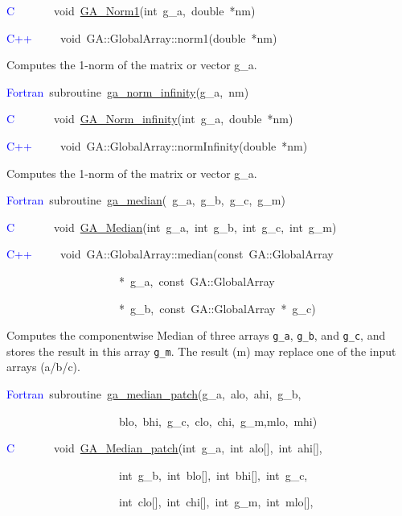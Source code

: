 \textcolor{blue}{C}~~~~~~~void~\href{https://hpc.pnl.gov/globalarrays/api/c_op_api.html\#ga_norm1}{GA\_{}Norm1}(int~g\_a,~double~{*}nm)

\textcolor{blue}{C++}~~~~~void~GA::GlobalArray::norm1(double~{*}nm)

Computes the 1-norm of the matrix or vector g\_a. 

\textcolor{blue}{Fortran}~subroutine~\href{https://hpc.pnl.gov/globalarrays/api/f_op_api.html\#ga_norm_infinity}{ga\_{}norm\_{}infinity}(g\_a,~nm)~

\textcolor{blue}{C}~~~~~~~void~\href{https://hpc.pnl.gov/globalarrays/api/c_op_api.html\#ga_norm_infinity}{GA\_{}Norm\_{}infinity}(int~g\_a,~double~{*}nm)~

\textcolor{blue}{C++}~~~~~void~GA::GlobalArray::normInfinity(double~{*}nm)

Computes the 1-norm of the matrix or vector g\_a. 

\textcolor{blue}{Fortran}~subroutine~\href{https://hpc.pnl.gov/globalarrays/api/f_op_api.html\#ga_median}{ga\_{}median}(~g\_a,~g\_b,~g\_c,~g\_m)

\textcolor{blue}{C}~~~~~~~void~\href{https://hpc.pnl.gov/globalarrays/api/c_op_api.html\#ga_median}{GA\_{}Median}(int~g\_a,~int~g\_b,~int~g\_c,~int~g\_m)

\textcolor{blue}{C++}~~~~~void~GA::GlobalArray::median(const~GA::GlobalArray~

~~~~~~~~~~~~~~~~~~~~{*}~g\_a,~const~GA::GlobalArray~

~~~~~~~~~~~~~~~~~~~~{*}~g\_b,~const~GA::GlobalArray~{*}~g\_c)

Computes the componentwise Median of three arrays \texttt{g\_a}, \texttt{g\_b},
and \texttt{g\_c}, and stores the result in this array \texttt{g\_m}.
The result (m) may replace one of the input arrays (a/b/c). 

\textcolor{blue}{Fortran}~subroutine~\href{https://hpc.pnl.gov/globalarrays/api/f_op_api.html\#ga_median_patch}{ga\_{}median\_{}patch}(g\_a,~alo,~ahi,~g\_b,~

~~~~~~~~~~~~~~~~~~~~blo,~bhi,~g\_c,~clo,~chi,~g\_m,mlo,~mhi)~

\textcolor{blue}{C}~~~~~~~void~\href{https://hpc.pnl.gov/globalarrays/api/c_op_api.html\#ga_median_patch}{GA\_{}Median\_{}patch}(int~g\_a,~int~alo{[}{]},~int~ahi{[}{]},~

~~~~~~~~~~~~~~~~~~~~int~g\_b,~int~blo{[}{]},~int~bhi{[}{]},~int~g\_c,~

~~~~~~~~~~~~~~~~~~~~int~clo{[}{]},~int~chi{[}{]},~int~g\_m,~int~mlo{[}{]},

